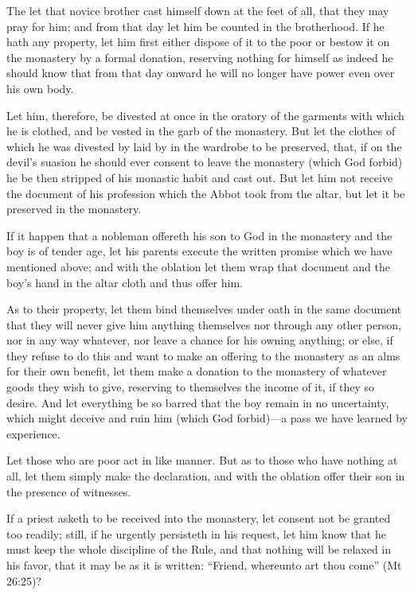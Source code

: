 The let that novice brother cast himself down at the feet of all, that they may pray for him; and from that day let him be counted in the brotherhood. If he hath any property, let him first either dispose of it to the poor or bestow it on the monastery by a formal donation, reserving nothing for himself as indeed he should know that from that day onward he will no longer have power even over his own body.

Let him, therefore, be divested at once in the oratory of the garments with which he is clothed, and be vested in the garb of the monastery. But let the clothes of which he was divested by laid by in the wardrobe to be preserved, that, if on the devil's suasion he should ever consent to leave the monastery (which God forbid) he be then stripped of his monastic habit and cast out. But let him not receive the document of his profession which the Abbot took from the altar, but let it be preserved in the monastery.


If it happen that a nobleman offereth his son to God in the monastery and the boy is of tender age, let his parents execute the written promise which we have mentioned above; and with the oblation let them wrap that document and the boy's hand in the altar cloth and thus offer him.

As to their property, let them bind themselves under oath in the same document that they will never give him anything themselves nor through any other person, nor in any way whatever, nor leave a chance for his owning anything; or else, if they refuse to do this and want to make an offering to the monastery as an alms for their own benefit, let them make a donation to the monastery of whatever goods they wish to give, reserving to themselves the income of it, if they so desire. And let everything be so barred that the boy remain in no uncertainty, which might deceive and ruin him (which God forbid)—a pass we have learned by experience.

Let those who are poor act in like manner. But as to those who have nothing at all, let them simply make the declaration, and with the oblation offer their son in the presence of witnesses.


If a priest asketh to be received into the monastery, let consent not be granted too readily; still, if he urgently persisteth in his request, let him know that he must keep the whole discipline of the Rule, and that nothing will be relaxed in his favor, that it may be as it is written: ``Friend, whereunto art thou come'' (Mt 26:25)?

